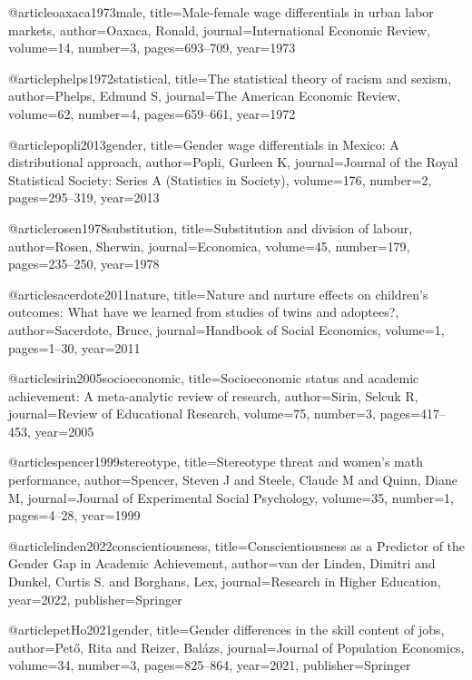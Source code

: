 @article{oaxaca1973male,
  title={Male-female wage differentials in urban labor markets},
  author={Oaxaca, Ronald},
  journal={International Economic Review},
  volume={14},
  number={3},
  pages={693--709},
  year={1973}
}

@article{phelps1972statistical,
  title={The statistical theory of racism and sexism},
  author={Phelps, Edmund S},
  journal={The American Economic Review},
  volume={62},
  number={4},
  pages={659--661},
  year={1972}
}

@article{popli2013gender,
  title={Gender wage differentials in Mexico: A distributional approach},
  author={Popli, Gurleen K},
  journal={Journal of the Royal Statistical Society: Series A (Statistics in Society)},
  volume={176},
  number={2},
  pages={295--319},
  year={2013}
}

@article{rosen1978substitution,
  title={Substitution and division of labour},
  author={Rosen, Sherwin},
  journal={Economica},
  volume={45},
  number={179},
  pages={235--250},
  year={1978}
}

@article{sacerdote2011nature,
  title={Nature and nurture effects on children’s outcomes: What have we learned from studies of twins and adoptees?},
  author={Sacerdote, Bruce},
  journal={Handbook of Social Economics},
  volume={1},
  pages={1--30},
  year={2011}
}

@article{sirin2005socioeconomic,
  title={Socioeconomic status and academic achievement: A meta-analytic review of research},
  author={Sirin, Selcuk R},
  journal={Review of Educational Research},
  volume={75},
  number={3},
  pages={417--453},
  year={2005}
}

@article{spencer1999stereotype,
  title={Stereotype threat and women’s math performance},
  author={Spencer, Steven J and Steele, Claude M and Quinn, Diane M},
  journal={Journal of Experimental Social Psychology},
  volume={35},
  number={1},
  pages={4--28},
  year={1999}
}

@article{linden2022conscientiousness,
  title={Conscientiousness as a Predictor of the Gender Gap in Academic Achievement},
  author={van der Linden, Dimitri and Dunkel, Curtis S. and Borghans, Lex},
  journal={Research in Higher Education},
  year={2022},
  publisher={Springer}
}

@article{petHo2021gender,
  title={Gender differences in the skill content of jobs},
  author={Pet{\H{o}}, Rita and Reizer, Bal{\'a}zs},
  journal={Journal of Population Economics},
  volume={34},
  number={3},
  pages={825--864},
  year={2021},
  publisher={Springer}
}

